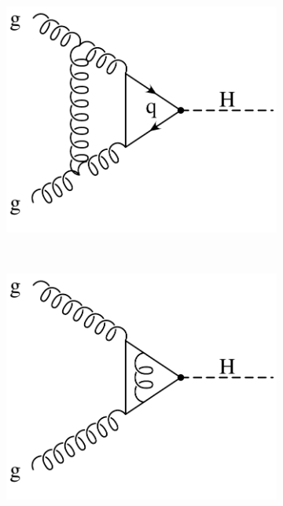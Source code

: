 %
\begin{figure}
\centering
\begin{subfigure}[]{0.3\textwidth}
	\includegraphics[width=\textwidth]{images/gluonfusion_virtual1.pdf}
	\caption{}
\end{subfigure}
~
\begin{subfigure}[]{0.3\textwidth}
	\includegraphics[width=\textwidth]{images/gluonfusion_virtual2.pdf}
	\caption{}
\end{subfigure}
~
\begin{subfigure}[]{0.3\textwidth}

\end{subfigure}
\end{figure}
